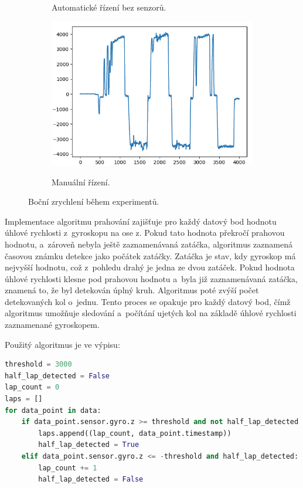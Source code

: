 \begin{figure}[!h]
\begin{subfigure}{.5\textwidth}
        \label{fig:LapsAuto}
        \caption{Automatické řízení bez senzorů.}
    \end{subfigure}
    \begin{subfigure}{.5\textwidth}
        \includegraphics[width = \textwidth]{Figures/LapManual.png}
        \label{fig:LapsManual}
        \caption{Manuální řízení.}
    \end{subfigure}
    \captionsetup{justification=centering}
    \caption{Boční zrychlení během experimentů.}
    \label{fig:Laps}
\end{figure}

Implementace algoritmu prahování zajišťuje pro každý datový bod hodnotu úhlové
rychlosti z~gyroskopu na ose z. Pokud tato hodnota překročí prahovou hodnotu,
a~zároveň nebyla ještě zaznamenávaná zatáčka, algoritmus zaznamená časovou známku 
detekce jako počátek zatáčky. Zatáčka je stav, kdy gyroskop má nejvyšší hodnotu, 
což z~pohledu drahý je jedna ze dvou zatáček. Pokud hodnota úhlové rychlosti klesne 
pod prahovou hodnotu a~byla již zaznamenávaná zatáčka, znamená to, že byl detekován 
úplný kruh. Algoritmus poté zvýší počet detekovaných kol o~jednu. Tento proces se 
opakuje pro každý datový bod, čímž algoritmus umožňuje sledování a~počítání ujetých 
kol na základě úhlové rychlosti zaznamenané gyroskopem. 

Použitý algoritmus je ve výpisu:

\begin{lstlisting}[language = python, caption = Počet kol, label = lst:countLap]
threshold = 3000
half_lap_detected = False
lap_count = 0
laps = []
for data_point in data:
    if data_point.sensor.gyro.z >= threshold and not half_lap_detected:
        laps.append((lap_count, data_point.timestamp))
        half_lap_detected = True
    elif data_point.sensor.gyro.z <= -threshold and half_lap_detected:
        lap_count += 1
        half_lap_detected = False
\end{lstlisting}


